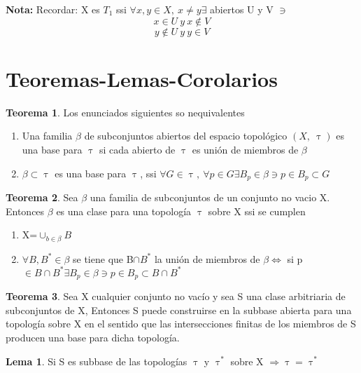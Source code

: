 \documentclass{article}
\theoremstyle{definition}
\newtheorem{theorem}{Teorema}[section]
\newtheorem{lemma}{Lema}[section]
\begin{document}
\textbf{Nota: } Recordar: X es $T_1$ ssi $\forall x,y\in X,\ x\neq y\exists$ abiertos U y V $\ni$
	\[x\in U \ y \ x\not\in V\]
	\[y\not\in U \ y \ y\in V\]




\newpage
\section{Teoremas-Lemas-Corolarios}
\begin{theorem}
	Los enunciados siguientes so nequivalentes
	\begin{enumerate}
		\item Una familia $\beta$ de subconjuntos abiertos del espacio topológico $(X,\ \uptau)$ es una base para $\uptau$ si cada abierto de $\uptau$ es unión de miembros de $\beta$
		\item $\beta\subset\uptau$ es una base para $\uptau$, ssi $\forall G\in \uptau,\ \forall p\in G \exists B_p\in\beta\ni p\in B_p\subset G$ 
	\end{enumerate}
\end{theorem}


\begin{theorem}
	 Sea $\beta$ una familia de subconjuntos de un conjunto no vacio X. Entonces $\beta$ es una clase para una topología $\uptau$ sobre X ssi se cumplen 
	 \begin{enumerate}
	 \item X=$\cup_{b\in\beta} B$
	 \item $\forall B, B^*\in\beta$ se tiene que B$\cap B^*$ la unión de miembros de $\beta \Leftrightarrow$ si p$\in B\cap B^*\exists B_p\in\beta\ni p\in B_p\subset B\cap B^*$ 
	 \end{enumerate}
\end{theorem}


\begin{theorem}
	Sea X cualquier conjunto no vacío y sea S una clase arbitriaria de subconjuntos de X, Entonces S puede construirse en la subbase abierta para una topología sobre X en el sentido que las intersecciones finitas de los miembros de S producen una base para dicha topología.
\end{theorem}


\begin{lemma}
Si S es subbase de las topologías $\uptau$ y $\uptau^*$  sobre X $\Rightarrow\uptau = \uptau^*$
\end{lemma}
\end{document}
